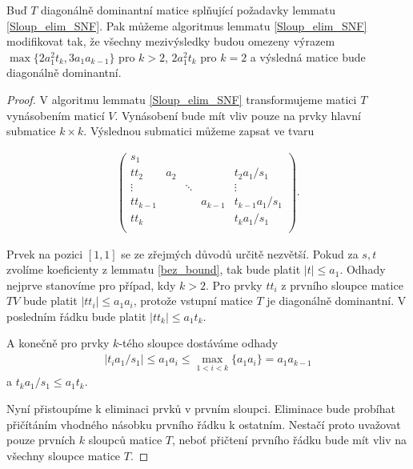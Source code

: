 \begin{lem}\label{Sloup_elim_SNF_modified}
Buď $ T $ diagonálně dominantní matice splňující požadavky lemmatu \ref{Sloup_elim_SNF}.
Pak můžeme algoritmus lemmatu \ref{Sloup_elim_SNF} modifikovat tak, že všechny
mezivýsledky budou omezeny výrazem 
$ \max\{ 2 a_1^2 t_k, 3 a_1 a_{k - 1} \} $ pro $ k > 2 $, 
$ 2 a_1^2 t_k $ pro $ k = 2 $
a výsledná matice bude diagonálně dominantní.
\end{lem}
\begin{proof}
V algoritmu lemmatu \ref{Sloup_elim_SNF} transformujeme matici $ T $ vynásobením 
maticí $ V $. Vynásobení bude mít vliv pouze na prvky hlavní submatice 
$ k \times k $. Výslednou submatici můžeme zapsat ve tvaru

\begin{align*}
    \left(
    \begin{array}{ccccc}
        s_1        &     &        &         &                 \\
        tt_2       & a_2 &        &         & t_2 a_1/s_1     \\
        \vdots     &     & \ddots &         & \vdots          \\
        tt_{k - 1} &     &        & a_{k-1} & t_{k-1} a_1/s_1 \\
        tt_k       &     &        &         & t_k a_1/s_1     \\
    \end{array}
    \right)
.
\end{align*}

Prvek na pozici $ [1,1] $ se ze zřejmých důvodů určitě nezvětší. Pokud za $ s, t $
zvolíme koeficienty z lemmatu \ref{bez_bound}, tak bude platit $ |t| \leq a_1 $.
Odhady nejprve stanovíme pro případ, kdy $ k > 2 $.
Pro prvky $ t t_i $ z prvního sloupce matice $ TV $ bude platit
$ |t t_i| \leq a_1 a_i $, protože vstupní matice $ T $ je diagonálně dominantní.
V posledním řádku bude platit $ |t t_k| \leq a_1 t_k $.

A konečně pro prvky $ k $-tého sloupce dostáváme odhady
\begin{align*}
|t_i a_1 / s_1| \leq a_1 a_i \leq \max\limits_{1 < i < k }\{ a_1 a_{i} \} = a_1 a_{k - 1}
\end{align*}
a $ t_k a_1 / s_1 \leq a_1 t_k $.

Nyní přistoupíme k eliminaci prvků v prvním sloupci. Eliminace bude probíhat
přičítáním vhodného násobku prvního řádku k ostatním. Nestačí proto uvažovat 
pouze prvních $ k $ sloupců matice $ T $, neboť přičtení prvního řádku bude
mít vliv na všechny sloupce matice $ T $.


\end{proof}
